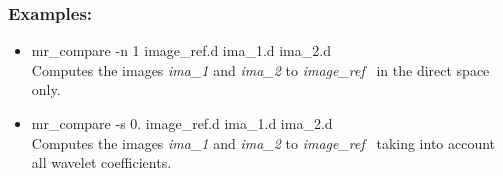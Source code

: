 \subsubsection*{Examples:}
\begin{itemize}
\item mr\_compare -n 1 image\_ref.d ima\_1.d ima\_2.d \\
Computes the images {\em ima\_1} and {\em ima\_2} to {\em image\_ref}
\  in the direct space only.
\item mr\_compare -s 0. image\_ref.d ima\_1.d ima\_2.d  \\
Computes the images {\em ima\_1} and {\em ima\_2} to {\em image\_ref}
\ taking into account all wavelet coefficients.
\end{itemize}


 

